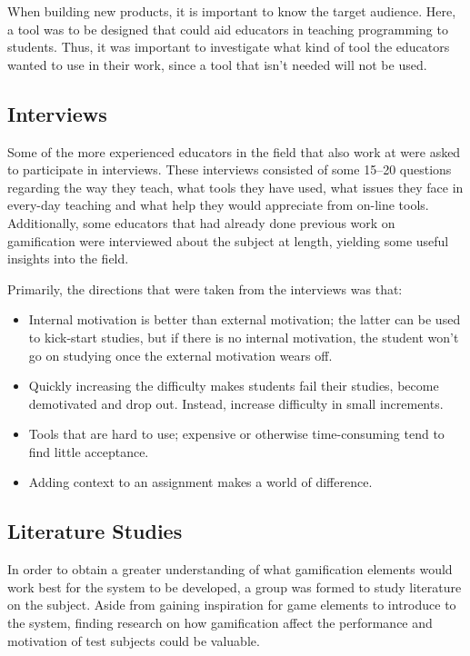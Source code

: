 When building new products, it is important to know the target audience. Here, a tool was to be designed that could aid educators in teaching programming to students. Thus, it was important to investigate what kind of tool the educators wanted to use in their work, since a tool that isn't needed will not be used.

\subsection{Interviews}
Some of the more experienced educators in the field that also work at \LTU{} were asked to participate in interviews. These interviews consisted of some 15--20 questions regarding the way they teach, what tools they have used, what issues they face in every-day teaching and what help they would appreciate from on-line tools. Additionally, some educators that had already done previous work on gamification were interviewed about the subject at length, yielding some useful insights into the field.

Primarily, the directions that were taken from the interviews was that:
\begin{itemize}
\item Internal motivation is better than external motivation; the latter can be used to kick-start studies, but if there is no internal motivation, the student won't go on studying once the external motivation wears off.
\item Quickly increasing the difficulty makes students fail their studies, become demotivated and drop out. Instead, increase difficulty in small increments.
\item Tools that are hard to use; expensive or otherwise time-consuming tend to find little acceptance.
\item Adding context to an assignment makes a world of difference.
\end{itemize}

\subsection{Literature Studies}
In order to obtain a greater understanding of what gamification elements would work best for the system to be developed, a group was formed to study literature on the subject. Aside from gaining inspiration for game elements to introduce to the system, finding research on how gamification affect the performance and motivation of test subjects could be valuable.

